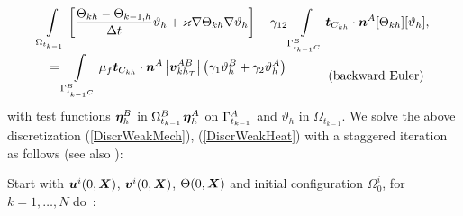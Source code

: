 \documentclass[12pt,a4paper]{scrbook}
\begin{document}
\begin{equation}\label{DiscrWeakHeat}
\begin{array}{c}
\begin{array}{l}
\displaystyle\Int_{\Omega_{t_{k-1}}}\left[\frac{\Theta_{kh}-\Theta_{k-1,h}}{\Delta t} \vartheta_h  +\varkappa \nabla \Theta_{kh} \nabla \vartheta_h \right] -\gamma_{12}\Int_{\Gamma_{t_{k-1}C}^{\sl}}\bv{t}_{C_{kh}}\cdot\bv{n}^{\ms}[\Theta_{kh}][\vartheta_{h}],
\end{array}
 \\[2ex]
\begin{array}{r}
\displaystyle= \Int_{\Gamma^{\sl}_{t_{k-1}C}}\mu_f \bv{t}_{C_{kh}}\cdot\bv{n}^{\ms} \left| \bv{v}^{\ms \sl}_{kh_{\ct}}\right|\left(\gamma_1\vartheta_h^{\sl}+\gamma_2\vartheta_h^{\ms}\right)
\end{array}\mbox{\hspace*{1cm}(backward Euler)}
\end{array}
\end{equation}
with test functions   $ \bv{\eta}_h^{\sl}$ in $\Omega_{t_{k-1}}^{\sl}$\quad $ \bv{\eta}_h^{\ms}$ on $\Gamma^{\ms}_{t_{k-1}}$ and  $\vartheta_h$ in $\Omega_{t_{k-1}}$.
We solve the above discretization (\ref{DiscrWeakMech}), (\ref{DiscrWeakHeat}) with a staggered iteration as follows (see also \cite{MuChaDBE3}):

Start with $\bv{u}^i(0,\bv{X})$, $\bv{v}^{i}(0,\bv{X})$, $\Theta(0,\bv{X})$ and initial configuration $\Omega_0^i$, for   $k=1,\ldots,N$ do~:
\end{document}
